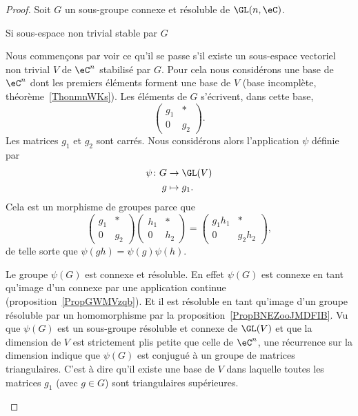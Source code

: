 \begin{proof}
    Soit \( G\) un sous-groupe connexe et résoluble de \( \GL(n,\eC)\).

    \begin{subproof}
        \item[Si sous-espace non trivial stable par \( G\)]

    Nous commençons par voir ce qu'il se passe s'il existe un sous-espace vectoriel non trivial \( V\) de \( \eC^n\) stabilisé par \( G\). Pour cela nous considérons une base de \( \eC^n\) dont les premiers éléments forment une base de \( V\) (base incomplète, théorème~\ref{ThonmnWKs}). Les éléments de \( G\) s'écrivent, dans cette base,
    \begin{equation}    \label{EqGOKTooEaGACG}
        \begin{pmatrix}
            g_1    &   *    \\
            0    &   g_2
        \end{pmatrix}.
    \end{equation}
    Les matrices \( g_1\) et \( g_2\) sont carrés. Nous considérons alors l'application \( \psi\) définie par
    \begin{equation}
        \begin{aligned}
            \psi\colon G&\to \GL(V) \\
            g&\mapsto g_1.
        \end{aligned}
    \end{equation}
    Cela est un morphisme de groupes parce que
    \begin{equation}
        \begin{pmatrix}
            g_1    &   *    \\
            0    &   g_2
        \end{pmatrix}\begin{pmatrix}
            h_1    &   *    \\
            0    &   h_2
        \end{pmatrix}=
        \begin{pmatrix}
            g_1h_1    &   *    \\
            0    &   g_2h_2
        \end{pmatrix},
    \end{equation}
    de telle sorte que \( \psi(gh)=\psi(g)\psi(h)\).

    Le groupe \( \psi(G)\) est connexe et résoluble. En effet \( \psi(G)\) est connexe en tant qu'image d'un connexe par une application continue (proposition~\ref{PropGWMVzqb}). Et il est résoluble en tant qu'image d'un groupe résoluble par un homomorphisme par la proposition~\ref{PropBNEZooJMDFIB}. Vu que \( \psi(G)\) est un sous-groupe résoluble et connexe de \( \GL(V)\) et que la dimension de \( V\) est strictement plis petite que celle de \( \eC^n\), une récurrence sur la dimension indique que \( \psi(G)\) est conjugué à un groupe de matrices triangulaires. C'est à dire qu'il existe une base de \( V\) dans laquelle toutes les matrices \( g_1\) (avec \( g\in G\)) sont triangulaires supérieures.


\end{subproof}
\end{proof}

